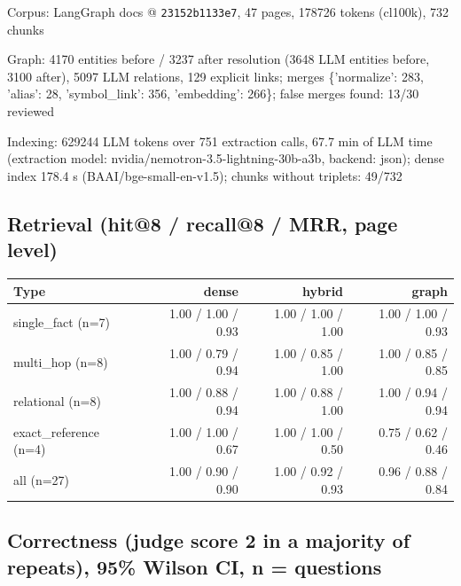 Corpus: LangGraph docs @ \texttt{23152b1133e7}, 47 pages, 178726 tokens (cl100k), 732 chunks

Graph: 4170 entities before / 3237 after resolution (3648 LLM entities before, 3100 after), 5097 LLM relations, 129 explicit links; merges \{'normalize': 283, 'alias': 28, 'symbol\_link': 356, 'embedding': 266\}; false merges found: 13/30 reviewed

Indexing: 629244 LLM tokens over 751 extraction calls, 67.7 min of LLM time (extraction model: nvidia/nemotron-3.5-lightning-30b-a3b, backend: json); dense index 178.4 s (BAAI/bge-small-en-v1.5); chunks without triplets: 49/732

\subsection*{Retrieval (hit@8 / recall@8 / MRR, page level)}

\begin{center}
\begin{tabular}{lrrr}
\toprule
Type & dense & hybrid & graph \\
\midrule
single\_fact (n=7) & 1.00 / 1.00 / 0.93 & 1.00 / 1.00 / 1.00 & 1.00 / 1.00 / 0.93 \\
multi\_hop (n=8) & 1.00 / 0.79 / 0.94 & 1.00 / 0.85 / 1.00 & 1.00 / 0.85 / 0.85 \\
relational (n=8) & 1.00 / 0.88 / 0.94 & 1.00 / 0.88 / 1.00 & 1.00 / 0.94 / 0.94 \\
exact\_reference (n=4) & 1.00 / 1.00 / 0.67 & 1.00 / 1.00 / 0.50 & 0.75 / 0.62 / 0.46 \\
all (n=27) & 1.00 / 0.90 / 0.90 & 1.00 / 0.92 / 0.93 & 0.96 / 0.88 / 0.84 \\
\bottomrule
\end{tabular}
\end{center}

\subsection*{Correctness (judge score 2 in a majority of repeats), 95\% Wilson CI, n = questions}

